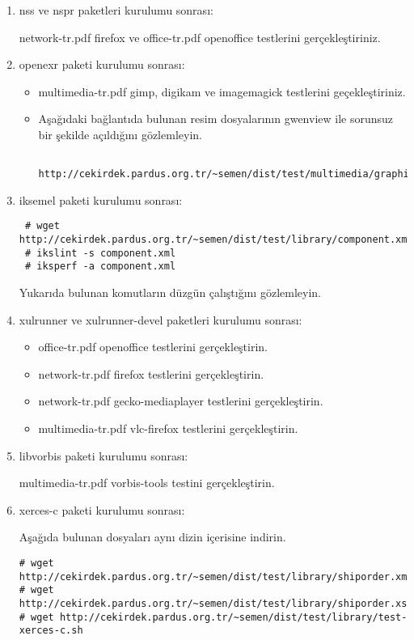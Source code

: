 \documentclass[a4paper,10pt]{article}
\begin{document}
\begin{enumerate}
\item nss ve nspr paketleri kurulumu sonrası:

network-tr.pdf firefox ve office-tr.pdf openoffice testlerini gerçekleştiriniz.

\item openexr paketi kurulumu sonrası:
\begin{itemize}
 \item multimedia-tr.pdf gimp, digikam ve imagemagick testlerini geçekleştiriniz.
 \item Aşağıdaki bağlantıda bulunan resim dosyalarının gwenview ile sorunsuz bir şekilde açıldığını gözlemleyin.
  \begin{verbatim}
   http://cekirdek.pardus.org.tr/~semen/dist/test/multimedia/graphics/graphics.tar
  \end{verbatim}
\end{itemize}
\item iksemel paketi kurulumu sonrası:
\begin{verbatim}
 # wget http://cekirdek.pardus.org.tr/~semen/dist/test/library/component.xml
 # ikslint -s component.xml
 # iksperf -a component.xml 
\end{verbatim}


Yukarıda bulunan komutların düzgün çalıştığını gözlemleyin.

\item xulrunner ve xulrunner-devel paketleri kurulumu sonrası:
\begin{itemize}
\item office-tr.pdf openoffice testlerini gerçekleştirin.
\item network-tr.pdf firefox testlerini gerçekleştirin.
\item network-tr.pdf gecko-mediaplayer testlerini gerçekleştirin.
\item multimedia-tr.pdf vlc-firefox testlerini gerçekleştirin.
\end{itemize}

\item libvorbis paketi kurulumu sonrası:

multimedia-tr.pdf vorbis-tools testini gerçekleştirin.

\item xerces-c paketi kurulumu sonrası:

Aşağıda bulunan dosyaları aynı dizin içerisine indirin.
\begin{verbatim}
# wget http://cekirdek.pardus.org.tr/~semen/dist/test/library/shiporder.xml
# wget http://cekirdek.pardus.org.tr/~semen/dist/test/library/shiporder.xsd
# wget http://cekirdek.pardus.org.tr/~semen/dist/test/library/test-xerces-c.sh
\end{verbatim}


\end{enumerate}
\end{document}
